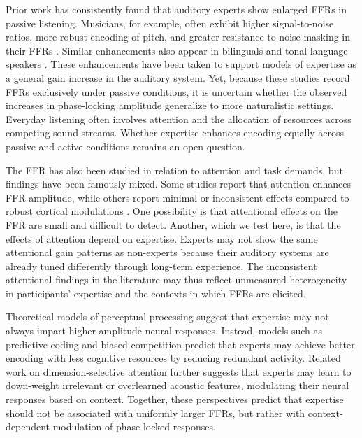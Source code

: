 \documentclass{article}
\begin{document}
Prior work has consistently found that auditory experts show enlarged FFRs in passive listening. Musicians, for example, often exhibit higher signal-to-noise ratios, more robust encoding of pitch, and greater resistance to noise masking in their FFRs \parencite{Parbery_Clark_2009, Strait_2009, Strait_2013, Wong_2007}. Similar enhancements also appear in bilinguals \parencite{Krizman_2012, Krizman_2014, Krizman_2014, Skoe_2017, Omote_2017} and tonal language speakers \parencite{Jeng_2011, Krishnan_2005}. These enhancements have been taken to support models of expertise as a general gain increase in the auditory system. Yet, because these studies record FFRs exclusively under passive conditions, it is uncertain whether the observed increases in phase-locking amplitude generalize to more naturalistic settings. Everyday listening often involves attention and the allocation of resources across competing sound streams. Whether expertise enhances encoding equally across passive and active conditions remains an open question.

The FFR has also been studied in relation to attention and task demands, but findings have been famously mixed. Some studies report that attention enhances FFR amplitude, while others report minimal or inconsistent effects compared to robust cortical modulations \parencite[e.g.][]{Galbraith_2003, Hairston_2013, Lehmann_2014, Galbraith_1993b, Hoormann_2000, Varghese_2015}. One possibility is that attentional effects on the FFR are small and difficult to detect. Another, which we test here, is that the effects of attention depend on expertise. Experts may not show the same attentional gain patterns as non-experts because their auditory systems are already tuned differently through long-term experience. The inconsistent attentional findings in the literature may thus reflect unmeasured heterogeneity in participants’ expertise and the contexts in which FFRs are elicited. 

Theoretical models of perceptual processing suggest that expertise may not always impart higher amplitude neural responses. Instead, models such as predictive coding \parencite{Rao_1999, Friston_2005} and biased competition \parencite{Chelazzi_1993, Li_1993} predict that experts may achieve better encoding with less cognitive resources by reducing redundant activity. Related work on dimension-selective attention \parencite{Holt_2018} further suggests that experts may learn to down-weight irrelevant or overlearned acoustic features, modulating their neural responses based on context. Together, these perspectives predict that expertise should not be associated with uniformly larger FFRs, but rather with context-dependent modulation of phase-locked responses.
\end{document}
